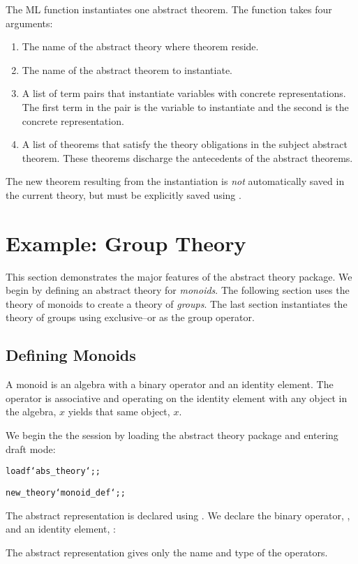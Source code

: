 The ML function  instantiates one
abstract theorem.  The function takes four arguments:
\begin{enumerate}
\item
The name of the abstract theory where theorem reside.
\item
The name of the abstract theorem to instantiate.
\item
A list of term pairs that instantiate variables with concrete
representations.  The first term in the pair is the variable to instantiate
and the second is the concrete representation.
\item
A list of theorems that satisfy the theory obligations in the subject
abstract theorem.  These theorems discharge the antecedents of the abstract
theorems.
\end{enumerate}
The new theorem resulting from the instantiation is {\em not} automatically
saved in the current theory, but must be explicitly saved using
.

\section{Example: Group Theory}
This section demonstrates the major features of the abstract theory
package.  We begin by defining an abstract theory for {\em monoids}.  The
following section uses the theory of monoids to create a theory of {\em
groups}.  The last section instantiates the theory of groups using
exclusive--or as the group operator.

\subsection{Defining Monoids}
A monoid is an algebra with a binary operator and an identity element.  The
operator is associative and operating on the identity element with any
object in the algebra, $x$ yields that same object, $x$.

We begin the the session by loading the abstract theory package and
entering draft mode:
\begin{boxed}\begin{hol}\begin{alltt}
loadf `abs_theory`;;

new_theory `monoid_def`;;
\end{alltt}\end{hol}\end{boxed}

The abstract representation is declared using
{}.  We declare the binary operator,
{}, and an identity element, :
\begin{boxed}\begin{hol}\begin{alltt}\end{alltt}\end{hol}\end{boxed}
The abstract representation gives only the name and type of the operators. 


